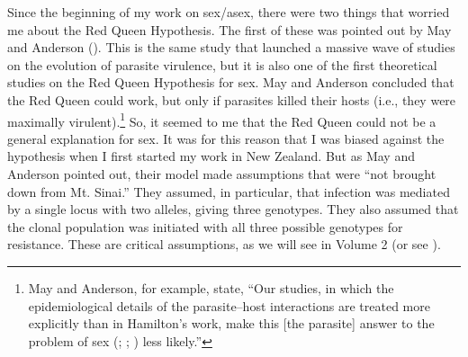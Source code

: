\documentclass[
  american,
  letterpaper,
]{book}
\begin{document}
Since the beginning of my work on sex/asex, there were two things that
worried me about the Red Queen Hypothesis. The first of these was
pointed out by May and Anderson (). This is
the same study that launched a massive wave of studies on the evolution
of parasite virulence, but it is also one of the first theoretical
studies on the Red Queen Hypothesis for sex. May and Anderson concluded
that the Red Queen could work, but only if parasites killed their hosts
(i.e., they were maximally virulent).\footnote{May and Anderson, for
  example, state, ``Our studies, in which the epidemiological details of
  the parasite--host interactions are treated more explicitly than in
  Hamilton's work, make this {[}the parasite{]} answer to the problem of
  sex (;
  ;
  ) less likely.''} So, it
seemed to me that the Red Queen could not be a general explanation for
sex. It was for this reason that I was biased against the hypothesis
when I first started my work in New Zealand. But as May and Anderson
pointed out, their model made assumptions that were ``not brought down
from Mt. Sinai.'' They assumed, in particular, that infection was
mediated by a single locus with two alleles, giving three genotypes.
They also assumed that the clonal population was initiated with all
three possible genotypes for resistance. These are critical assumptions,
as we will see in Volume 2 (or see ).
\end{document}
